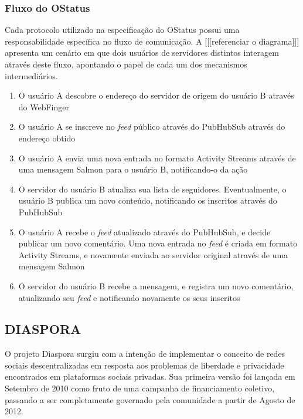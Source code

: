 \subsubsection{Fluxo do OStatus}

Cada protocolo utilizado na especificação do OStatus possui uma responsabilidade
específica no fluxo de comunicação. A [[[referenciar o diagrama]]] apresenta um
cenário em que dois usuários de servidores distintos interagem através deste fluxo,
apontando o papel de cada um dos mecanismos intermediários.


\begin{enumerate}
  \item{O usuário A descobre o endereço do servidor de origem do usuário B através
        do WebFinger}
  \item{O usuário A se inscreve no \textit{feed} público através do PubHubSub
        através do endereço obtido}
  \item{O usuário A envia uma nova entrada no formato Activity Streams através de
        uma mensagem Salmon para o usuário B, notificando-o da ação}
  \item{O servidor do usuário B atualiza sua lista de seguidores. Eventualmente, o
        usuário B publica um novo conteúdo, notificando os inscritos através do
        PubHubSub}
  \item{O usuário A recebe o \textit{feed} atualizado através do PubHubSub, e decide
        publicar um novo comentário. Uma nova entrada no \textit{feed} é criada em
        formato Activity Streams, e novamente enviada ao servidor original através
        de uma mensagem Salmon}
  \item{O servidor do usuário B recebe a mensagem, e registra um novo comentário,
        atualizando seu \textit{feed} e notificando novamente os seus inscritos}
\end{enumerate}


\subsection{DIASPORA}

O projeto Diaspora surgiu com a intenção de implementar o conceito de redes sociais
descentralizadas em resposta aos problemas de liberdade e privacidade encontrados em
plataformas sociais privadas. Sua primeira versão foi lançada em Setembro de 2010
como fruto de uma campanha de financiamento coletivo, passando a ser completamente
governado pela comunidade a partir de Agosto de 2012.

